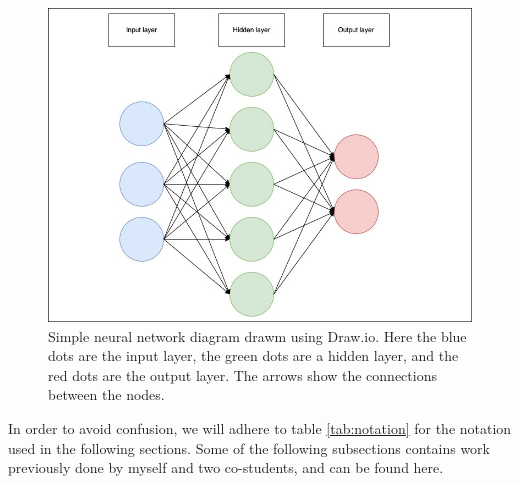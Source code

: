 \begin{figure}[H]
    \includegraphics[width=\linewidth]{Figures/Machinelearning/nn_diagram.jpeg}
    \caption[Simple diagram of a neural network]{Simple neural network diagram drawm using Draw.io. Here the blue dots are the input layer, the green dots are a hidden layer, 
    and the red dots are the output layer. The arrows show the connections between the nodes. }
    \label{fig:nndiagram}
\end{figure}

In order to avoid confusion, we will adhere to table \ref{tab:notation} for the notation used in the following sections.
Some of the following subsections contains work previously done by myself and two co-students, and can be found here\cite{FYSSTK}.

